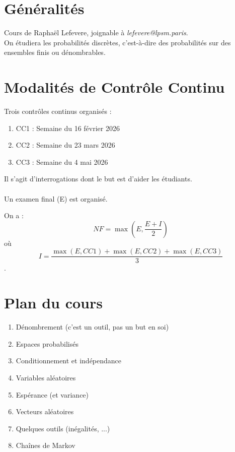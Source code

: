 \documentclass{article}
\begin{document}

\section{Généralités}

\noindent Cours de Raphaël Lefevere, joignable à \textit{lefevere@lpsm.paris}.\\
On étudiera les probabilités discrètes, c'est-à-dire des probabilités sur des ensembles finis ou dénombrables.\\


\section{Modalités de Contrôle Continu}

Trois contrôles continus organisés :
\begin{enumerate}
    \item CC1 : Semaine du 16 février 2026
    \item CC2 : Semaine du 23 mars 2026
    \item CC3 : Semaine du 4 mai 2026
\end{enumerate}
Il s'agit d'interrogations dont le but est d'aider les étudiants.\\\\
Un examen final (E) est organisé.

On a : 
\[NF = \max\left(E, \frac{E+I}{2}\right)\] où \[I = \frac{\max(E, CC1) + \max(E, CC2) + \max(E, CC3)}{3}\].

\section{Plan du cours}
\begin{enumerate}
    \item Dénombrement (c'est un outil, pas un but en soi)
    \item Espaces probabilisés
    \item Conditionnement et indépendance
    \item Variables aléatoires 
    \item Espérance (et variance)
    \item Vecteurs aléatoires
    \item Quelques outils (inégalités, ...)
    \item Chaînes de Markov
\end{enumerate}
\end{document}
